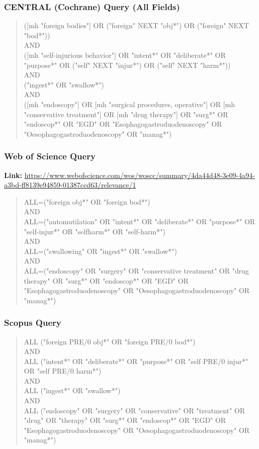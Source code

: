 \begin{appendices}
\subsubsection{CENTRAL (Cochrane) Query (All Fields)}
\begin{quote}
([mh "foreign bodies"] OR ("foreign" NEXT "obj*") OR ("foreign" NEXT "bod*"))\\
AND\\
([mh "self-injurious behavior"] OR "intent*" OR "deliberate*" OR "purpose*" OR ("self" NEXT "injur*") OR ("self" NEXT "harm*"))\\
AND\\
("ingest*" OR "swallow*")\\
AND\\
([mh "endoscopy"] OR [mh "surgical procedures, operative"] OR [mh "conservative treatment"] OR [mh "drug therapy"] OR "surg*" OR "endoscop*" OR "EGD" OR "Esophagogastroduodenoscopy" OR "Oesophagogastroduodenoscopy" OR "manag*")
\end{quote}

\subsubsection{Web of Science Query}
\textbf{Link:} \url{https://www.webofscience.com/wos/woscc/summary/4da44d48-3e09-4a94-a3bd-ff8139e94859-01387ccd63/relevance/1}
\begin{quote}
ALL=("foreign obj*" OR "foreign bod*")\\
AND\\
ALL=("automutilation" OR "intent*" OR "deliberate*" OR "purpose*" OR "self-injur*" OR "selfharm*" OR "self-harm*")\\
AND\\
ALL=("swallowing" OR "ingest*" OR "swallow*")\\
AND\\
ALL=("endoscopy" OR "surgery" OR "conservative treatment" OR "drug therapy" OR "surg*" OR "endoscop*" OR "EGD" OR "Esophagogastroduodenoscopy" OR "Oesophagogastroduodenoscopy" OR "manag*")
\end{quote}

\subsubsection{Scopus Query}
\begin{quote}
ALL ("foreign PRE/0 obj*" OR "foreign PRE/0 bod*")\\
AND\\
ALL ("intent*" OR "deliberate*" OR "purpose*" OR "self PRE/0 injur*" OR "self PRE/0 harm*")\\
AND\\
ALL ("ingest*" OR "swallow*")\\
AND\\
ALL ("endoscopy" OR "surgery" OR "conservative" OR "treatment" OR "drug" OR "therapy" OR "surg*" OR "endoscop*" OR "EGD" OR "Esophagogastroduodenoscopy" OR "Oesophagogastroduodenoscopy" OR "manag*")
\end{quote}


\end{appendices}
